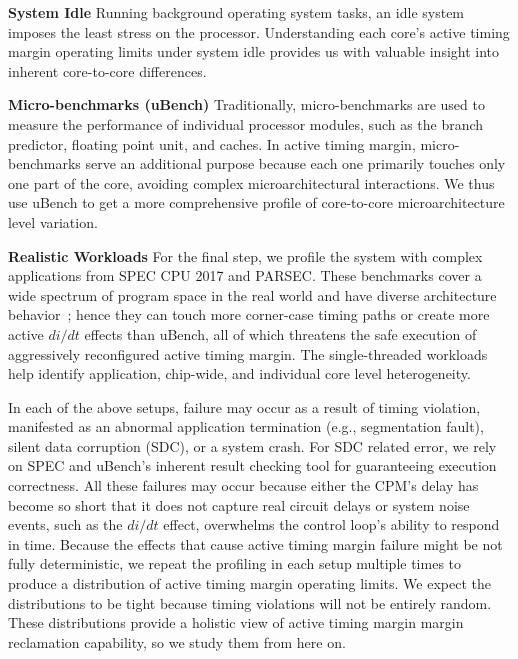 \textbf{System Idle} Running background operating system tasks, an idle system imposes the least stress on the processor. {Understanding each core's active timing margin operating limits under system idle provides us with valuable insight into inherent core-to-core differences.}

\textbf{Micro-benchmarks (uBench)} Traditionally, micro-benchmarks are used to measure the performance of individual processor modules, such as the branch predictor, floating point unit, and caches. In active timing margin, micro-benchmarks serve an additional purpose because each one primarily touches only one part of the core, avoiding complex microarchitectural interactions. We thus use uBench to get a more comprehensive profile of core-to-core microarchitecture level variation.



\textbf{Realistic Workloads} %
For the final step, we profile the system with complex applications from SPEC CPU 2017 and PARSEC. These benchmarks cover a wide spectrum of program space in the real world and have diverse architecture behavior~\cite{song2018spec,bienia2008parsecsplash}; hence they can touch more corner-case timing paths or create more active $di/dt$ effects than uBench, all of which threatens the safe execution of aggressively reconfigured active timing margin. {The single-threaded workloads help identify application, chip-wide, and individual core level heterogeneity.}

In each of the above setups, failure may occur as a result of timing violation, manifested as an abnormal application termination (e.g., segmentation fault), silent data corruption (SDC), or a system crash. For SDC related error, we rely on SPEC and uBench's inherent result checking tool for guaranteeing execution correctness. All these failures may occur because either the CPM's delay has become so short that it does not capture real circuit delays or system noise events, such as the $di/dt$ effect, overwhelms the control loop's ability to respond in time. Because the effects that cause active timing margin failure might be not fully deterministic, we repeat the profiling in each setup multiple times to produce a distribution of active timing margin operating limits. We expect the distributions to be tight because timing violations will not be entirely random. These distributions provide a holistic view of active timing margin margin reclamation capability, so we study them from here on.

